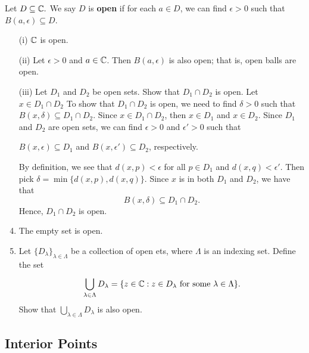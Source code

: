 \documentclass[a4paper]{report}
\begin{document}
\begin{definition}
   Let \( D \subseteq  \mathbb{C} .  \) We say \( D  \) is \textbf{open} if for each \( a \in D  \), we can find \( \epsilon > 0  \) such that  
   \(  B(a,\epsilon) \subseteq D  \).
\end{definition}

\begin{eg}
    \begin{enumerate}
        \item[(i)] \( \mathbb{C}  \) is open.
        \item[(ii)] Let \( \epsilon > 0  \) and \( a \in \mathbb{C}  \). Then \( B(a,\epsilon)  \) is also open; that is, open balls are open.
        \item[(iii)] Let \( {D}_{1} \) and \( {D}_{2} \) be open sets.
            Show that \( {D}_{1} \cap {D}_{2} \) is open. Let \( x \in {D}_{1} \cap {D}_{2} \) To show that \( {D}_{1} \cap {D}_{2} \) is open, we need to find \( \delta > 0  \) such that \( B(x,\delta) \subseteq {D}_{1} \cap {D}_{2} \). Since \( x \in {D}_{1} \cap {D}_{2} \), then \( x \in {D}_{1} \) and \( x \in {D}_{2} \). Since \( {D}_{1} \) and \( {D}_{2} \) are open sets, we can find \( \epsilon > 0  \) and \( \epsilon' > 0  \) such that 
            \begin{center}
               \( B(x,\epsilon) \subseteq {D}_{1} \) and \( B(x, \epsilon') \subseteq  {D}_{2} \), respectively. 
            \end{center} By definition, we see that \( d(x,p) < \epsilon \) for all \( p \in {D}_{1} \) and \( d(x,q) < \epsilon' \). Then pick \( \delta = \min \{ d(x,p), d(x,q) \}  \). Since \( x  \) is in both \( {D}_{1} \) and \( {D}_{2} \), we have that 
            \[  B(x,\delta) \subseteq  {D}_{1} \cap {D}_{2}. \]
            Hence, \( {D}_{1} \cap {D}_{2} \) is open.
        \item The empty set is open.
        \item Let \( \{ {D}_{\lambda}  \}_{\lambda \in \Lambda} \) be a collection of open ets, where \( \Lambda \) is an indexing set. Define the set
            \[  \bigcup_{ \lambda \in \Lambda }^{  }  {D}_{\lambda} = \{ z \in \mathbb{C} : z \in {D}_{\lambda} \ \text{for some} \ \lambda \in \Lambda \}. \]
            Show that \( \bigcup_{ \lambda \in \Lambda }^{  } {D}_{\lambda}  \) is also open.
    \end{enumerate}
\end{eg}


\subsection{Interior Points}\label{Interior Points}
\end{document}

